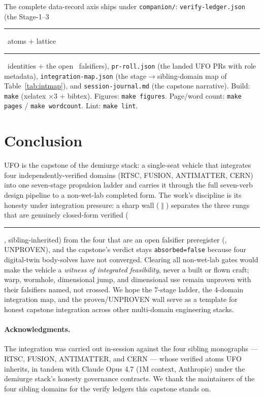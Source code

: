 \documentclass[11pt,a4paper]{article}
\newcommand{\tierdisc}[1]{\textcolor{#1}{\rule[0.05ex]{1.0ex}{1.0ex}}}
\newcommand{\tierdiscopen}{\textcolor{gray!60!black}{\scalebox{0.6}{$\bigcirc$}}}
\newcommand{\tierBlue}{\tierdisc{blue!70!black}}
\newcommand{\tierGreen}{\tierdisc{green!60!black}}
\newcommand{\tierWhite}{\tierdiscopen}
\newcommand{\wall}{\;\big\Vert\;}
\begin{document}
\smallskip\noindent
The complete data-record axis ships under \texttt{companion/}:
\texttt{verify-ledger.json} (the Stage-1--3 \tierGreen\ atoms $+$
lattice \tierBlue\ identities $+$ the open \tierWhite\ falsifiers),
\texttt{pr-roll.json} (the landed UFO PRs with role metadata),
\texttt{integration-map.json} (the stage$\to$sibling-domain map of
Table~\ref{tab:intmap}), and \texttt{session-journal.md} (the capstone
narrative). Build: \texttt{make} (xelatex $\times 3$ $+$ bibtex).
Figures: \texttt{make figures}. Page/word count: \texttt{make pages} /
\texttt{make wordcount}. Lint: \texttt{make lint}.

\section{Conclusion}
\label{sec:conclusion}

UFO is the capstone of the demiurge stack: a single-seat vehicle that
integrates four independently-verified domains (RTSC, FUSION,
ANTIMATTER, CERN) into one seven-stage propulsion ladder and carries it
through the full seven-verb design pipeline to a non-wet-lab completed
form. The work's discipline is its honesty under integration pressure:
a sharp wall ($\wall$) separates the three rungs that are genuinely
closed-form verified (\tierGreen, sibling-inherited) from the four that
are an open falsifier preregister (\tierWhite, UNPROVEN), and the
capstone's verdict stays \texttt{absorbed=false} because four
digital-twin body-solves have not converged. Clearing all non-wet-lab
gates would make the vehicle a \emph{witness of integrated feasibility},
never a built or flown craft; warp, wormhole, dimensional jump, and
dimensional use remain unproven with their falsifiers named, not
crossed. We hope the 7-stage ladder, the 4-domain integration map, and
the proven/UNPROVEN wall serve as a template for honest capstone
integration across other multi-domain engineering stacks.

\paragraph{Acknowledgments.} The integration was carried out
in-session against the four sibling monographs --- RTSC, FUSION,
ANTIMATTER, and CERN --- whose verified atoms UFO inherits, in tandem
with Claude Opus 4.7 (1M context, Anthropic) under the demiurge stack's
honesty governance contracts. We thank the maintainers of the four
sibling domains for the verify ledgers this capstone stands on.
\end{document}
